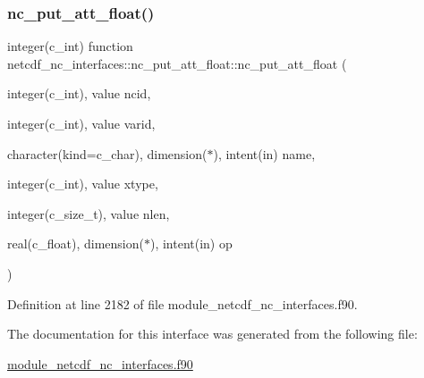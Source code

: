 \subsubsection{\texorpdfstring{nc\+\_\+put\+\_\+att\+\_\+float()}{nc\_put\_att\_float()}}
{\footnotesize\ttfamily integer(c\+\_\+int) function netcdf\+\_\+nc\+\_\+interfaces\+::nc\+\_\+put\+\_\+att\+\_\+float\+::nc\+\_\+put\+\_\+att\+\_\+float (\begin{DoxyParamCaption}\item[{integer(c\+\_\+int), value}]{ncid,  }\item[{integer(c\+\_\+int), value}]{varid,  }\item[{character(kind=c\+\_\+char), dimension($\ast$), intent(in)}]{name,  }\item[{integer(c\+\_\+int), value}]{xtype,  }\item[{integer(c\+\_\+size\+\_\+t), value}]{nlen,  }\item[{real(c\+\_\+float), dimension($\ast$), intent(in)}]{op }\end{DoxyParamCaption})}



Definition at line 2182 of file module\+\_\+netcdf\+\_\+nc\+\_\+interfaces.\+f90.



The documentation for this interface was generated from the following file\+:\begin{DoxyCompactItemize}
\item 
\hyperlink{module__netcdf__nc__interfaces_8f90}{module\+\_\+netcdf\+\_\+nc\+\_\+interfaces.\+f90}\end{DoxyCompactItemize}

